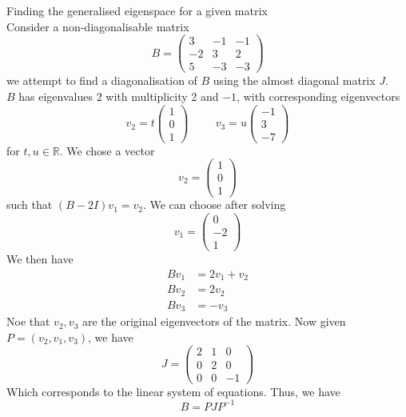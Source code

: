 \documentclass[journal, letterpaper]{IEEEtran}
\begin{document}
    \begin{myboxg}{Finding the generalised eigenspace for a given matrix} \\
        Consider a non-diagonalisable matrix
        $$ B = \begin{pmatrix}
            3 & -1 & -1 \\-2 & 3 & 2 \\ 5 & -3 & -3
        \end{pmatrix}$$
        we attempt to find a diagonalisation of $B$ using the almost diagonal matrix $J$.
        \newline \\ 
        $B$ has eigenvalues $2$ with multiplicity 2 and $-1$, with corresponding eigenvectors
        $$ v_2 = t\begin{pmatrix}
            1 \\ 0 \\ 1
        \end{pmatrix} \hspace{1cm} v_3= u\begin{pmatrix}
            -1 \\ 3 \\ -7
        \end{pmatrix}$$
        for $t, u \in \mathbb{R}$. We chose a vector
        $$ v_2 = \begin{pmatrix}
            1 \\ 0 \\ 1
        \end{pmatrix}$$
        such that $(B - 2I)v_1 = v_2$. We can choose after solving
        $$ v_1 = \begin{pmatrix}
            0 \\ -2 \\ 1
        \end{pmatrix}$$
        We then have
        \begin{align*}
            Bv_1 &= 2v_1 + v_2 \\ 
            Bv_2 &= 2v_2 \\
            Bv_3 &= -v_3
        \end{align*}
        Noe that $v_2, v_3$ are the original eigenvectors of the matrix.
        Now given $P = (v_2, v_1, v_3)$, we have
        $$ J = \begin{pmatrix}
            2 & 1 & 0 \\ 0 & 2 & 0 \\ 0 & 0 & -1
        \end{pmatrix}$$
        Which corresponds to the linear system of equations. Thus, we have
        $$ B = PJP^{-1}$$
    \end{myboxg}
\end{document}
